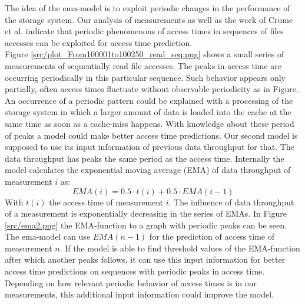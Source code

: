 \documentclass{superfri}
\begin{document}
The idea of the ema-model is to exploit periodic changes in the performance of the storage system.
Our analysis of measurements as well as the work of Crume et al. \cite{Crume:2013:FML:2538542.2538561} indicate that periodic phenomenons of access times in sequences of files accesses can be exploited for access time prediction.\\
Figure \ref{src/plot_From100001to100250_read_seq.png} shows a small series of measurements of sequentially read file accesses.
The peaks in access time are occurring periodically in this particular sequence. Such behavior appears only partially, often access times fluctuate without observable periodicity as in Figure.
An occurrence of a periodic pattern could be explained with a processing of the storage system in which a larger amount of data is loaded into the cache at the same time as soon as a cache-miss happens.
With knowledge about these period of peaks a model could make better access time predictions.
Our second model is supposed to use its input information of previous data throughput for that.
The data throughput has peaks the same period as the access time.
Internally the model calculates the exponential moving average (EMA) of data throughput of measurement $i$ as:
\begin{equation}
EMA(i) = 0.5 \cdot t(i)+ 0.5 \cdot EMA(i-1)
\end{equation}
With $t(i)$ the access time of measurement $i$.
The influence of data throughput of a measurement is exponentially decreasing in the series of EMAs.
In Figure \ref{src/ema2.png} the EMA-function to a graph with periodic peaks can be seen.
\\
The ema-model can use $EMA(n-1)$ for the prediction of access time of measurement $n$.
If the model is able to find threshold values of the EMA-function after which another peaks follows, it can use this input information for better access time predictions on sequences with periodic peaks in access time. Depending on how relevant periodic behavior of access times is in our measurements, this additional input information could improve the model.\medskip

\end{document}
